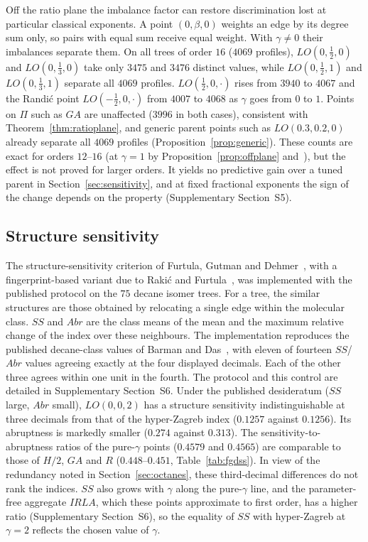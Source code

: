 \documentclass[a5paper, 10pt]{article}
\theoremstyle{plain}
\theoremstyle{remark}
\theoremstyle{definition}
\begin{document}
Off the ratio plane the imbalance factor can restore discrimination
lost at particular classical exponents. A point $(0,\beta,0)$ weights
an edge by its degree sum only, so pairs with equal sum receive equal
weight. With $\gamma \neq 0$ their imbalances separate them. On all
trees of order $16$ ($4069$ profiles), $LO(0,\tfrac12,0)$ and
$LO(0,\tfrac13,0)$ take only $3475$ and $3476$ distinct values, while
$LO(0,\tfrac12,1)$ and $LO(0,\tfrac13,1)$ separate all $4069$ profiles.
$LO(\tfrac12,0,\cdot)$ rises from $3940$ to $4067$ and the Randi\'c
point $LO(-\tfrac12,0,\cdot)$ from $4007$ to $4068$ as $\gamma$ goes
from $0$ to $1$. Points on $\Pi$ such as $GA$ are unaffected ($3996$
in both cases), consistent with Theorem~\ref{thm:ratioplane}, and generic
parent points such as $LO(0.3,0.2,0)$ already separate all $4069$
profiles (Proposition~\ref{prop:generic}). These counts are exact for orders $12$--$16$ (at
$\gamma = 1$ by Proposition~\ref{prop:offplane} and~\cite{Besicovitch1940}), but the effect is not proved
for larger orders. It yields
no predictive gain over a tuned parent in Section~\ref{sec:sensitivity},
and at fixed fractional exponents the sign of the change depends on the
property (Supplementary Section~S5).

\subsection{Structure sensitivity}\label{sec:ss}

The structure-sensitivity criterion of Furtula, Gutman and
Dehmer~\cite{FurtulaGutmanDehmer2013SS}, with a fingerprint-based
variant due to Raki\'c and Furtula~\cite{RakicFurtula2019SS}, was
implemented with the published protocol on the $75$ decane isomer
trees. For a tree, the similar structures are those obtained by
relocating a single edge within the molecular class. $SS$ and $Abr$
are the class means of the mean and the maximum relative change of the
index over these neighbours. The implementation reproduces the
published decane-class values of Barman and Das~\cite{BarmanDas2026HSO},
with eleven of fourteen $SS$/$Abr$ values agreeing exactly at the four
displayed decimals. Each of the other three agrees within one unit in
the fourth. The protocol and this control are detailed in Supplementary
Section~S6.
Under the published desideratum ($SS$ large, $Abr$ small), $LO(0,0,2)$
has a structure sensitivity indistinguishable at three decimals from
that of the hyper-Zagreb index
($0.1257$ against $0.1256$). Its abruptness is markedly smaller ($0.274$
against $0.313$). The sensitivity-to-abruptness ratios of the
pure-$\gamma$ points ($0.4579$ and $0.4565$) are comparable to those of
$H/2$, $GA$ and $R$ ($0.448$--$0.451$, Table~\ref{tab:fgdss}). In view
of the redundancy noted in Section~\ref{sec:octanes}, these
third-decimal differences do not rank the indices. $SS$ also grows with
$\gamma$ along the pure-$\gamma$ line, and the parameter-free aggregate
$IRLA$, which these points approximate to first order, has a higher ratio
(Supplementary Section~S6), so the equality of $SS$ with hyper-Zagreb at
$\gamma = 2$ reflects the chosen value of $\gamma$.
\end{document}
